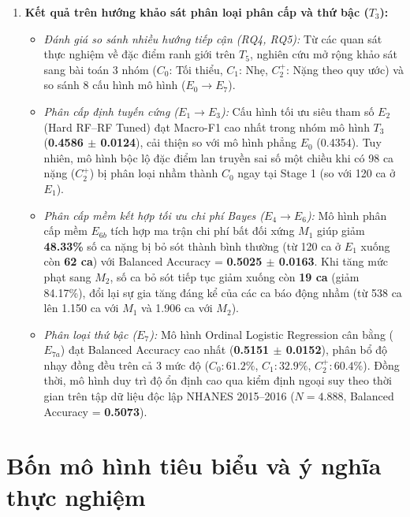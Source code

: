 \begin{enumerate}
    \item \textbf{Kết quả trên hướng khảo sát phân loại phân cấp và thứ bậc ($T_3$):}
    \begin{itemize}
        \item \textit{Đánh giá so sánh nhiều hướng tiếp cận (RQ4, RQ5):} Từ các quan sát thực nghiệm về đặc điểm ranh giới trên $T_5$, nghiên cứu mở rộng khảo sát sang bài toán 3 nhóm ($C_0$: Tối thiểu, $C_1$: Nhẹ, $C_2^+$: Nặng theo quy ước) và so sánh 8 cấu hình mô hình ($E_0 \to E_7$).
        \item \textit{Phân cấp định tuyến cứng ($E_1 \to E_3$):} Cấu hình tối ưu siêu tham số $E_2$ (Hard RF--RF Tuned) đạt Macro-F1 cao nhất trong nhóm mô hình $T_3$ (\textbf{0.4586 $\pm$ 0.0124}), cải thiện so với mô hình phẳng $E_0$ (0.4354). Tuy nhiên, mô hình bộc lộ đặc điểm lan truyền sai số một chiều khi có 98 ca nặng ($C_2^+$) bị phân loại nhầm thành $C_0$ ngay tại Stage 1 (so với 120 ca ở $E_1$).
        \item \textit{Phân cấp mềm kết hợp tối ưu chi phí Bayes ($E_4 \to E_6$):} Mô hình phân cấp mềm $E_{6b}$ tích hợp ma trận chi phí bất đối xứng $M_1$ giúp giảm \textbf{48.33\%} số ca nặng bị bỏ sót thành bình thường (từ 120 ca ở $E_1$ xuống còn \textbf{62 ca}) với Balanced Accuracy = \textbf{0.5025 $\pm$ 0.0163}. Khi tăng mức phạt sang $M_2$, số ca bỏ sót tiếp tục giảm xuống còn \textbf{19 ca} (giảm 84.17\%), đổi lại sự gia tăng đáng kể của các ca báo động nhầm (từ 538 ca lên 1.150 ca với $M_1$ và 1.906 ca với $M_2$).
        \item \textit{Phân loại thứ bậc ($E_7$):} Mô hình Ordinal Logistic Regression cân bằng ($E_{7a}$) đạt Balanced Accuracy cao nhất (\textbf{0.5151 $\pm$ 0.0152}), phân bổ độ nhạy đồng đều trên cả 3 mức độ ($C_0: 61.2\%$, $C_1: 32.9\%$, $C_2^+: 60.4\%$). Đồng thời, mô hình duy trì độ ổn định cao qua kiểm định ngoại suy theo thời gian trên tập dữ liệu độc lập NHANES 2015--2016 ($N = 4.888$, Balanced Accuracy = \textbf{0.5073}).
    \end{itemize}
\end{enumerate}

\section{Bốn mô hình tiêu biểu và ý nghĩa thực nghiệm}
\label{sec:khuyen-nghi-mo-hinh}

